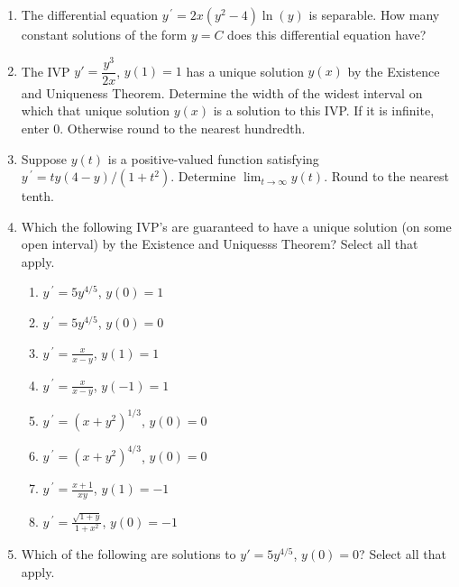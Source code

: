 \documentclass{ximera}
\begin{document}
\begin{enumerate}[label=(\arabic*)]


\item The differential equation $y^{\,\prime}=2x(y^2-4)\ln (y)$ is separable. How many constant solutions of the form $y=C$ does this differential equation have? 


\item The IVP $y'=\dfrac{y^3}{2x}$, $y(1)=1$ has a unique solution $y(x)$ by the Existence and Uniqueness Theorem. Determine the width of the widest interval on which that unique solution $y(x)$ is a solution to this IVP.  If it is infinite, enter 0.  Otherwise round to the nearest hundredth. 


\newpage


\item  Suppose $y(t)$ is a positive-valued function satisfying $y\,^{\prime}=ty(4-y)/(1+t^2)$.  Determine $\displaystyle \lim_{t\rightarrow \infty}y(t)$.  Round to the nearest tenth. 



\item Which the following IVP's are guaranteed to have a unique solution (on some open interval) by the Existence and Uniquesss Theorem?  Select all that apply.


\begin{enumerate}[label=(\alph*)]
\item $y\,^{\prime}=5y^{4/5}$, $y(0)=1$    %
\item $y\,^{\prime}=5y^{4/5}$, $y(0)=0$  
\item $\displaystyle y\,^{\prime}=\frac{x}{x-y}$, $y(1)=1$
\item $\displaystyle y\,^{\prime}=\frac{x}{x-y}$, $y(-1)=1$  %
\item $\displaystyle y\,^{\prime}=\left(x+y^2\right)^{1/3}$, $y(0)=0$
\item $\displaystyle y\,^{\prime}=\left(x+y^2\right)^{4/3}$, $y(0)=0$  %
\item $\displaystyle y\,^{\prime}=\frac{x+1}{xy}$, $y(1)=-1$  %
\item $\displaystyle y\,^{\prime}=\frac{\sqrt{1+y}}{1+x^2}$, $y(0)=-1$
\end{enumerate}



\item  Which of the following are solutions to $y'=5y^{4/5}$, $y(0)=0$?  Select all that apply.


\end{enumerate}
\end{document}
